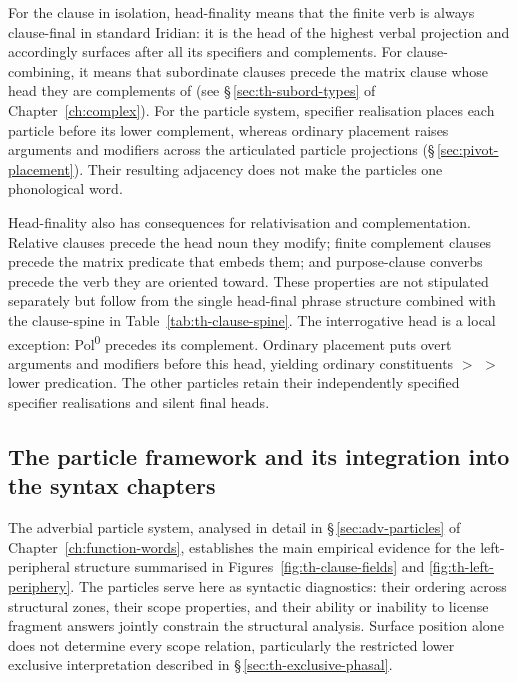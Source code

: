 For the clause in isolation, head-finality means that the finite verb is always
clause-final in standard Iridian: it is the head of the highest verbal
projection and accordingly surfaces after all its specifiers and complements.
For clause-combining, it means that subordinate clauses precede the matrix
clause whose head they are complements of (see §\,\ref{sec:th-subord-types}
of Chapter~\ref{ch:complex}). For the particle system, specifier realisation places each particle before
its lower complement, whereas ordinary placement raises arguments and
modifiers across the articulated particle projections
(§\,\ref{sec:pivot-placement}). Their resulting adjacency does not make
the particles one phonological word.

Head-finality also has consequences for relativisation and complementation.
Relative clauses precede the head noun they modify; finite complement clauses
precede the matrix predicate that embeds them; and purpose-clause converbs
precede the verb they are oriented toward. These properties are not stipulated
separately but follow from the single head-final phrase structure combined with
the clause-spine in Table~\ref{tab:th-clause-spine}. The interrogative head
 is a local exception: Pol\textsuperscript{0} precedes its
complement. Ordinary placement puts overt arguments and modifiers before
this head, yielding ordinary constituents $>$  $>$ lower
predication. The other particles retain their independently specified
specifier realisations and silent final heads.

\subsection{The particle framework and its integration into the syntax
chapters}
\label{sec:th-particle-framework}

The adverbial particle system, analysed in detail in §\,\ref{sec:adv-particles}
of Chapter~\ref{ch:function-words}, establishes the main empirical evidence for
the left-peripheral structure summarised in Figures~\ref{fig:th-clause-fields}
and \ref{fig:th-left-periphery}. The particles serve here as syntactic
diagnostics: their ordering across structural zones, their scope properties,
and their ability or inability to license fragment answers jointly constrain
the structural analysis. Surface position alone does not
determine every scope relation, particularly the restricted lower exclusive
interpretation described in §\,\ref{sec:th-exclusive-phasal}.


